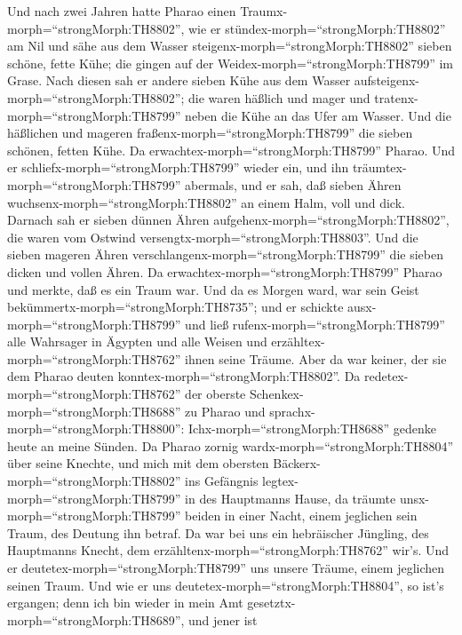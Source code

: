  Und nach zwei Jahren hatte Pharao einen
Traumx-morph=``strongMorph:TH8802'', wie er
stündex-morph=``strongMorph:TH8802'' am Nil  und sähe aus
dem Wasser steigenx-morph=``strongMorph:TH8802'' sieben schöne, fette
Kühe; die gingen auf der Weidex-morph=``strongMorph:TH8799'' im Grase.
 Nach diesen sah er andere sieben Kühe aus dem Wasser
aufsteigenx-morph=``strongMorph:TH8802''; die waren häßlich und mager
und tratenx-morph=``strongMorph:TH8799'' neben die Kühe an das Ufer am
Wasser.  Und die häßlichen und mageren
fraßenx-morph=``strongMorph:TH8799'' die sieben schönen, fetten Kühe. Da
erwachtex-morph=``strongMorph:TH8799'' Pharao.  Und er
schliefx-morph=``strongMorph:TH8799'' wieder ein, und ihn
träumtex-morph=``strongMorph:TH8799'' abermals, und er sah, daß sieben
Ähren wuchsenx-morph=``strongMorph:TH8802'' an einem Halm, voll und
dick.  Darnach sah er sieben dünnen Ähren
aufgehenx-morph=``strongMorph:TH8802'', die waren vom Ostwind
versengtx-morph=``strongMorph:TH8803''.  Und die sieben
mageren Ähren verschlangenx-morph=``strongMorph:TH8799'' die sieben
dicken und vollen Ähren. Da erwachtex-morph=``strongMorph:TH8799''
Pharao und merkte, daß es ein Traum war.  Und da es Morgen
ward, war sein Geist bekümmertx-morph=``strongMorph:TH8735''; und er
schickte ausx-morph=``strongMorph:TH8799'' und ließ
rufenx-morph=``strongMorph:TH8799'' alle Wahrsager in Ägypten und alle
Weisen und erzähltex-morph=``strongMorph:TH8762'' ihnen seine Träume.
Aber da war keiner, der sie dem Pharao deuten
konntex-morph=``strongMorph:TH8802''.  Da
redetex-morph=``strongMorph:TH8762'' der oberste
Schenkex-morph=``strongMorph:TH8688'' zu Pharao und
sprachx-morph=``strongMorph:TH8800'': Ichx-morph=``strongMorph:TH8688''
gedenke heute an meine Sünden.  Da Pharao zornig
wardx-morph=``strongMorph:TH8804'' über seine Knechte, und mich mit dem
obersten Bäckerx-morph=``strongMorph:TH8802'' ins Gefängnis
legtex-morph=``strongMorph:TH8799'' in des Hauptmanns Hause,
 da träumte unsx-morph=``strongMorph:TH8799'' beiden in
einer Nacht, einem jeglichen sein Traum, des Deutung ihn betraf.
 Da war bei uns ein hebräischer Jüngling, des Hauptmanns
Knecht, dem erzähltenx-morph=``strongMorph:TH8762'' wir's. Und er
deutetex-morph=``strongMorph:TH8799'' uns unsere Träume, einem jeglichen
seinen Traum.  Und wie er uns
deutetex-morph=``strongMorph:TH8804'', so ist's ergangen; denn ich bin
wieder in mein Amt gesetztx-morph=``strongMorph:TH8689'', und jener ist
